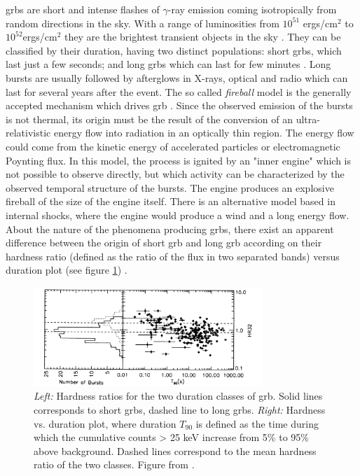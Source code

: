 \documentclass[main.tex]{subfiles}
\begin{document}
\glspl{grb} are short and intense flashes of $\gamma$-ray emission coming isotropically from random directions in the sky. With a range of luminosities from $10^{51}$ ergs/cm$^2$ to $10^{52} $ergs/cm$^2$ they are the brightest transient objects in the sky \cite{2004GRB}. They can be classified by their duration, having two distinct populations: short \glspl{grb}, which last just a few seconds; and long \glspl{grb} which can last for few minutes \cite{1993GRB2pop}. Long bursts are usually followed by afterglows in X-rays, optical and radio which can last for several years after the event.
The so called \textit{fireball} model is the generally accepted mechanism which drives \gls{grb} \cite{1999GRBfireball}. Since the observed emission of the bursts is not thermal, its origin must be the result of the conversion of an ultra-relativistic  energy flow into radiation in an optically thin region. The energy flow could come from the kinetic energy of accelerated particles or electromagnetic Poynting flux. In this model, the process is ignited by an "inner engine" which is not possible to observe directly, but which activity can be characterized by the observed temporal structure of the bursts. The engine produces an explosive fireball of the size of the engine itself. There is an alternative model based in internal shocks, where the engine would produce a wind and a long energy flow. About the nature of the phenomena producing \glspl{grb}, there exist an apparent difference between the origin of short \gls{grb} and long \gls{grb} according on their hardness ratio (defined as the ratio of the flux in two separated bands) versus duration plot (see figure \ref{fig:GRB2classes}) \cite{1993GRB2pop}.

\begin{figure}
\centering
 \includegraphics[width=0.77\textwidth]{Pictures/GRBhardnessdurationplot.pdf}
  \caption{\textit{Left:} Hardness ratios for the two duration classes of \gls{grb}. Solid lines corresponds to short \glspl{grb}, dashed line to long \glspl{grb}. \textit{Right:} Hardness vs. duration plot, where duration $T_{90}$ is defined as the time during which the cumulative counts > 25 keV increase from 5\% to 95\% above background. Dashed lines correspond to the mean hardness ratio of the two classes. Figure from \cite{1993GRB2pop}.}
    \label{fig:GRB2classes}
\end{figure}
\end{document}
